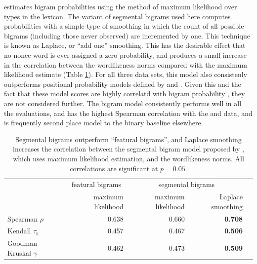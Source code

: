 \citeauthor{Albright2009a} estimates bigram probabilities using the method of maximum likelihood over types in the lexicon. The variant of segmental bigrams used here computes probabilities with a simple type of smoothing in which the count of all possible bigrams (including those never observed) are incremented by one. This technique is known as Laplace, or ``add one'' smoothing. This has the desirable effect that no nonce word is ever assigned a zero probability, and produces a small increase in the correlation between the \citeauthor{Albright2003b} wordlikeness norms compared with the maximum likelihood estimate (Table \ref{albrightimproved}). For all three data sets, this model also consistenly outperforms positional probability models defined by \citet{Vitevitch2004} and \citet{Vaden2009}. 
Given this and the fact that these model scores are highly correlatd with bigram probability \citep[][54]{Vitevitch1997}, they are not considered further. The bigram model consistently performs well in all the evaluations, and has the highest Spearman correlation with the \citeauthor{Greenberg1964} and \citeauthor{Scholes1966} data, and is frequently second place model to the binary baseline elsewhere.

\begin{table} \centering
\begin{tabular}{l r r r r}
\toprule
                         & \multicolumn{1}{c}{featural bigrams} & \multicolumn{2}{c}{segmental bigrams}  \\
                         & maximum likelihood                   & maximum likelihood & Laplace smoothing \\
\midrule
Spearman $\rho$          & 0.638                                & 0.660              & \textbf{0.708}    \\
Kendall $\tau_b$         & 0.457                                & 0.467              & \textbf{0.506}    \\
Goodman-Kruskal $\gamma$ & 0.462                                & 0.473              & \textbf{0.509}    \\
\bottomrule
\end{tabular}
\caption{Segmental bigrams outperform ``featural bigrams'', and Laplace smoothing increases the correlation between the segmental bigram model proposed by \citet{Albright2009a}, which uses maximum likelihood estimation, and the \citet{Albright2003b} wordlikeness norms. All correlations are significant at $p = 0.05$.}
\label{albrightimproved}
\end{table}

